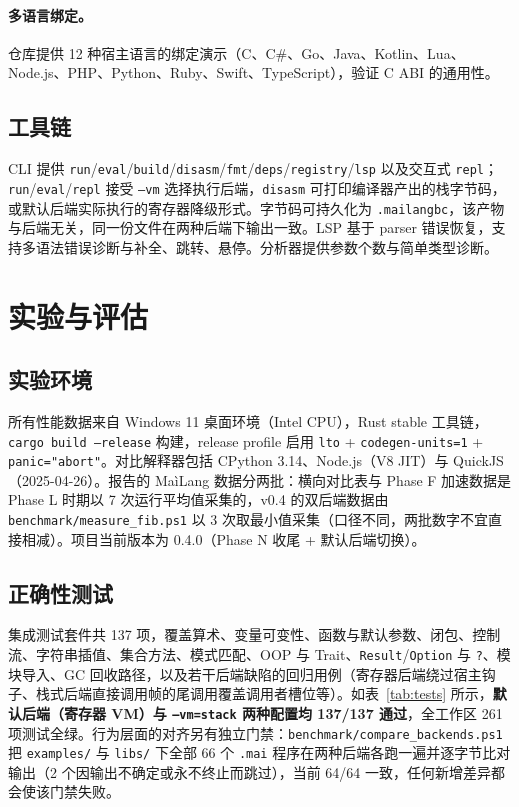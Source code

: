 \documentclass[10pt,a4paper]{article}
\begin{document}
\paragraph{多语言绑定。}
仓库提供 12 种宿主语言的绑定演示（C、C\#、Go、Java、Kotlin、Lua、Node.js、PHP、Python、Ruby、Swift、TypeScript），验证 C ABI 的通用性。

\subsection{工具链}

CLI 提供 \texttt{run}/\texttt{eval}/\texttt{build}/\texttt{disasm}/\texttt{fmt}/\texttt{deps}/\texttt{registry}/\texttt{lsp} 以及交互式 \texttt{repl}；\texttt{run}/\texttt{eval}/\texttt{repl} 接受 \texttt{--vm} 选择执行后端，\texttt{disasm} 可打印编译器产出的栈字节码，或默认后端实际执行的寄存器降级形式。字节码可持久化为 \texttt{.mailangbc}，该产物与后端无关，同一份文件在两种后端下输出一致。LSP 基于 parser 错误恢复，支持多语法错误诊断与补全、跳转、悬停。分析器提供参数个数与简单类型诊断。

\section{实验与评估}
\label{sec:eval}

\subsection{实验环境}

所有性能数据来自 Windows 11 桌面环境（Intel CPU），Rust stable 工具链，\texttt{cargo build --release} 构建，release profile 启用 \texttt{lto} + \texttt{codegen-units=1} + \texttt{panic="abort"}。对比解释器包括 CPython 3.14、Node.js（V8 JIT）与 QuickJS（2025-04-26）。报告的 MaìLang 数据分两批：横向对比表与 Phase F 加速数据是 Phase L 时期以 7 次运行平均值采集的，v0.4 的双后端数据由 \texttt{benchmark/measure\_fib.ps1} 以 3 次取最小值采集（口径不同，两批数字不宜直接相减）。项目当前版本为 0.4.0（Phase N 收尾 + 默认后端切换）。

\subsection{正确性测试}

集成测试套件共 137 项，覆盖算术、变量可变性、函数与默认参数、闭包、控制流、字符串插值、集合方法、模式匹配、OOP 与 Trait、\texttt{Result}/\texttt{Option} 与 \texttt{?}、模块导入、GC 回收路径，以及若干后端缺陷的回归用例（寄存器后端绕过宿主钩子、栈式后端直接调用帧的尾调用覆盖调用者槽位等）。如表~\ref{tab:tests} 所示，\textbf{默认后端（寄存器 VM）与 \texttt{--vm=stack} 两种配置均 137/137 通过}，全工作区 261 项测试全绿。行为层面的对齐另有独立门禁：\texttt{benchmark/compare\_backends.ps1} 把 \texttt{examples/} 与 \texttt{libs/} 下全部 66 个 \texttt{.mai} 程序在两种后端各跑一遍并逐字节比对输出（2 个因输出不确定或永不终止而跳过），当前 64/64 一致，任何新增差异都会使该门禁失败。
\end{document}
